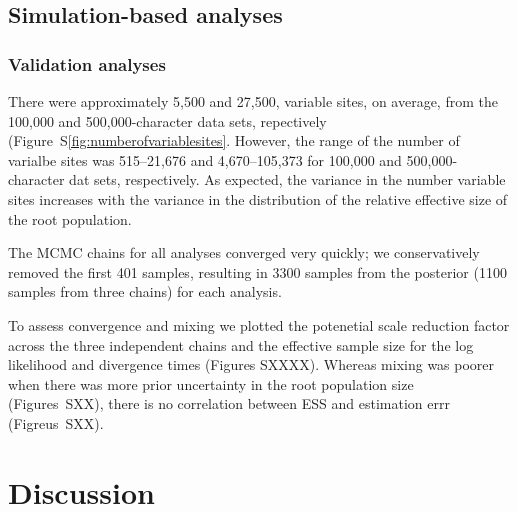 \subsection{Simulation-based analyses}

\subsubsection{Validation analyses}

There were approximately 5,500 and 27,500, variable sites, on average, from the
100,000 and 500,000-character data sets, repectively
(Figure~S\ref{fig:numberofvariablesites}.
However, the range of the number of varialbe sites was 515--21,676 
and 4,670--105,373 for 100,000 and 500,000-character dat sets, respectively.
As expected, the variance in the number variable sites increases with the
variance in the distribution of the relative effective size of the root
population.

The MCMC chains for all analyses converged very quickly;
we conservatively removed the first 401 samples, resulting in 3300 samples from
the posterior (1100 samples from three chains) for each analysis.

To assess convergence and mixing we plotted the potenetial scale reduction
factor across the three independent chains and the effective sample size for
the log likelihood and divergence times (Figures SXXXX).
Whereas mixing was poorer when there was more prior uncertainty in
the root population size (Figures~SXX), there is no correlation
between ESS and estimation errr (Figreus~SXX).


\section{Discussion}
